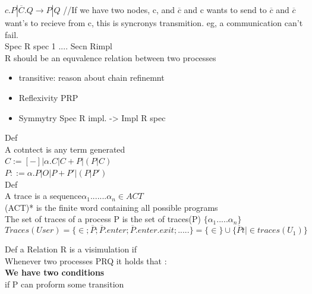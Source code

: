 \documentclass[a4paper,10pt,titlepage]{report}
\begin{document}
$c.P | \overline{C}.Q \rightarrow P | Q$ \hspace{2mm} //If we have two nodes, c, and $\overline{c}$ and c wants to send to $\overline{c}$ and $\overline{c}$ want's to recieve from c, this is syncronys transmition. eg, a communication can't fail.\\




Spec R spec 1 .... Secn Rimpl\\

R should be an equvalence relation between two processes\\
\begin{itemize}
\item transitive: reason about chain refinemnt
\item	Reflexivity PRP
\item	Symmytry Spec R impl. -> Impl R spec
\end{itemize}
	
	
	
Def\\
A cotntect is any term generated\\
$
C:= [-] | \alpha .C | C+P | (P|C)
$\\

$
P::= \alpha . P | O | P+P' | (P|P')
$\\



Def\\
A trace is a sequence$  \alpha_1 ....... \alpha_n \in ACT $\\

(ACT)* is the finite word containing all possible programs\\




The set of traces of a process P is the set of traces(P) $\{\alpha_1 ..... \alpha_n\}$\\


\begin{equation}
Traces(User) = \{\in;  \overline{P}; \overline{P}.enter; \overline{P}.enter.exit; .....\} = \{\in\} \cup \{\overline{P}t | \in traces (U_1)\}  
\end{equation}
		     
		     
Def a Relation R is a visimulation if\\
Whenever two processes PRQ it holds that :\\
\textbf{We have two conditions}\\
	if P can proform some transition \\
\end{document}
